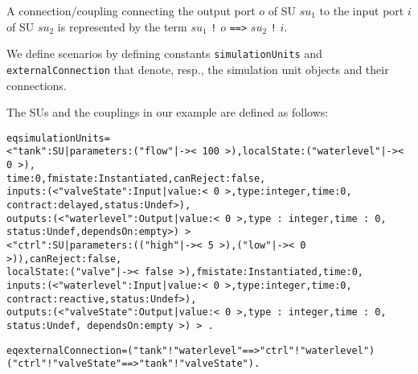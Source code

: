 A connection/coupling connecting the output port $o$ of SU $\mathit{su}_1$ to
the input port $i$ of SU $\mathit{su}_2$ is represented by the term
$\mathit{su}_1$ \texttt{!} $o$ \texttt{==>}
$\mathit{su}_2$ \texttt{!} $i$.   %



We define scenarios by defining constants \texttt{simulationUnits}
and \texttt{externalConnection} that denote, resp.,  the
simulation unit objects and  their connections. 

\begin{example}\label{ex:simulationunits}
The SUs and the couplings in our  example are defined as
follows:

\scriptsize
\begin{alltt}
eq simulationUnits = 
   < "tank" : SU | parameters : ("flow" |-> <\,100\,>),  localState : ("waterlevel" |-> <\,0\,>),
                   time : 0,  fmistate : Instantiated, canReject : false, 
                   inputs : (< "valveState" : Input | value : <\,0\,>, type : integer, time : 0,
                                                      contract : delayed, status : Undef >), 
                   outputs : (< "waterlevel" : Output | value : <\,0\,>, type\,:\,integer, time\,:\,0,
                                                        status : Undef, dependsOn : empty >)\,>
   < "ctrl" : SU | parameters : (("high" |-> <\,5\,>) , ("low" |-> <\,0\,>)), canReject : false, 
                   localState : ("valve" |-> <\,false\,>), fmistate : Instantiated, time : 0, 
                   inputs : (< "waterlevel" : Input | value : <\,0\,>, type : integer, time : 0,
                                                      contract : reactive, status : Undef >), 
                   outputs : (< "valveState" : Output | value : <\,0\,>, type\,:\,integer, time\,:\,0,
                                                        status : Undef,\,dependsOn : empty\,>)\,>\,.

eq externalConnection = ("tank" ! "waterlevel" ==> "ctrl" ! "waterlevel") 
                        ("ctrl" ! "valveState" ==> "tank" ! "valveState") .
\end{alltt}
\normalsize
\end{example}

